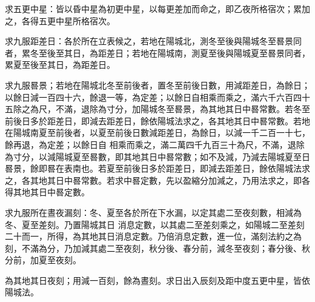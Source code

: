 \begin{pinyinscope}
 求五更中星：皆以昏中星為初更中星，以每更差加而命之，即乙夜所格宿次；累加之，各得五更中星所格宿次。



 求九服距差日：各於所在立表候之，若地在陽城北，測冬至後與陽城冬至晷景同者，累冬至後至其日，為距差日；若地在陽城南，測夏至後與陽城夏至晷景同者，累夏至後至其日，為距差日。



 求九服晷景；若地在陽城北冬至前後者，置冬至前後日數，用減距差日，為餘日；以餘日減一百四十六，餘退一等，為定差；以餘日自相乘而乘之，滿六千六百四十五除之為尺，不滿，退除為寸分，加陽城冬至晷景，為其地其日中晷常數。若冬至前後日多於距差日，即減去距差日，餘依陽城法求之，各其地其日中晷常數。若地在陽城南夏至前後者，以夏至前後日數減距差日，為餘日，以減一千二百一十七，餘再退，為定差；以餘日自
 相乘而乘之，滿二萬四千九百三十為尺，不滿，退除為寸分，以減陽城夏至晷數，即其地其日中晷常數；如不及減，乃減去陽城夏至日晷景，餘即晷在表南也。若夏至前後日多於距差日，即減去距差日，餘依陽城法求之，各其地其日中晷常數。若求中晷定數，先以盈縮分加減之，乃用法求之，即各得其地其日中晷定數。



 求九服所在晝夜漏刻：冬、夏至各於所在下水漏，以定其處二至夜刻數，相減為冬、夏至差刻。乃置陽城其日
 消息定數，以其處二至差刻乘之，如陽城二至差刻二十而一，所得，為其地其日消息定數。乃倍消息定數，進一位，滿刻法約之為刻，不滿為分，乃加減其處二至夜刻，秋分後、春分前，減冬至夜刻；春分後、秋分前，加夏至夜刻。



 為其地其日夜刻；用減一百刻，餘為晝刻。求日出入辰刻及距中度五更中星，皆依陽城法。



\end{pinyinscope}